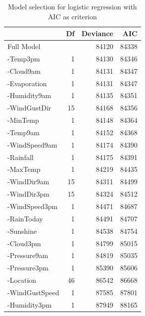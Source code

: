 \documentclass[11pt, a4paper, jou]{apa7}
\begin{document}
\begin{table}[h]
    \centering
    \caption{Model selection for logistic regression with AIC as criterion}
    \label{tab:model_selection_aic}
    \begin{tabular}{lrrr}
    \hline
                   & Df & Deviance & AIC                          \\ \hline
    Full Model     &    & 84120    & {\color[HTML]{FE0000} 84338} \\
    -Temp3pm       & 1  & 84130    & 84346                        \\
    -Cloud9am      & 1  & 84131    & 84347                        \\
    -Evaporation   & 1  & 84131    & 84347                        \\
    -Humidity9am   & 1  & 84135    & 84351                        \\
    -WindGustDir   & 15 & 84168    & 84356                        \\
    -MinTemp       & 1  & 84148    & 84364                        \\
    -Temp9am       & 1  & 84152    & 84368                        \\
    -WindSpeed9am  & 1  & 84174    & 84390                        \\
    -Rainfall      & 1  & 84175    & 84391                        \\
    -MaxTemp       & 1  & 84219    & 84435                        \\
    -WindDir9am    & 15 & 84311    & 84499                        \\
    -WindDir3pm    & 15 & 84324    & 84512                        \\
    -WindSpeed3pm  & 1  & 84471    & 84687                        \\
    -RainToday     & 1  & 84491    & 84707                        \\
    -Sunshine      & 1  & 84538    & 84754                        \\
    -Cloud3pm      & 1  & 84799    & 85015                        \\
    -Pressure9am   & 1  & 84819    & 85035                        \\
    -Pressure3pm   & 1  & 85390    & 85606                        \\
    -Location      & 46 & 86542    & 86668                        \\
    -WindGustSpeed & 1  & 87585    & 87801                        \\
    -Humidity3pm   & 1  & 87949    & 88165                        \\ \hline
    \end{tabular}
\end{table}
\end{document}
